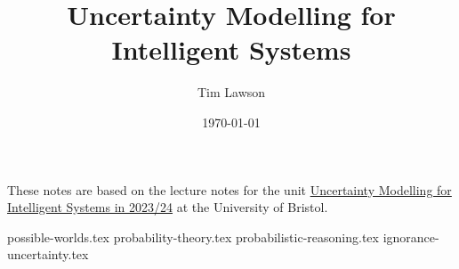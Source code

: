 \documentclass[a4paper]{extarticle}
\title{Uncertainty Modelling for Intelligent Systems}
\author{Tim Lawson}
\date{\today}
\begin{document}
\maketitle

These notes are based on the lecture notes for the unit
\href{https://www.bris.ac.uk/unit-programme-catalogue/UnitDetails.jsa?
  ayrCode=23\%2F24&unitCode=EMATM1120}
{Uncertainty Modelling for Intelligent Systems in 2023/24} at the University of
Bristol.

\tableofcontents

\newpage
\listoftheorems[numwidth=3em,title=Theorems]

{possible-worlds.tex}
{probability-theory.tex}
{probabilistic-reasoning.tex}
{ignorance-uncertainty.tex}
\end{document}
